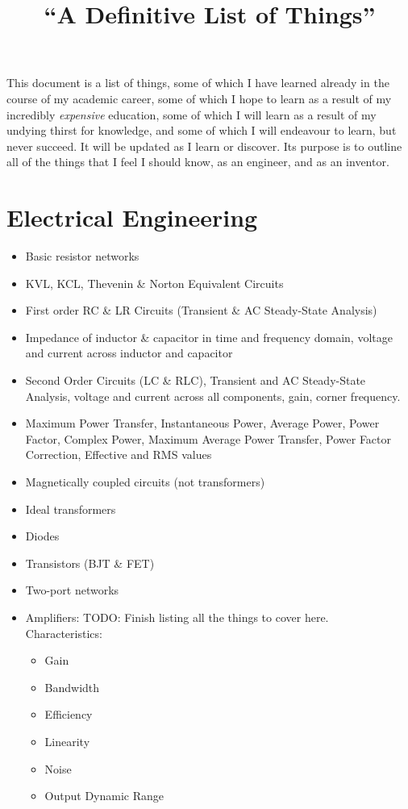 \documentclass[a4paper]{article}
\begin{document}
\title{``A Definitive List of Things''}

This document is a list of things, some of which I have learned already in the
course of my academic career, some of which I hope to learn as a result of my
incredibly \emph{expensive} education, some of which I will learn as a result
of my undying thirst for knowledge, and some of which I will endeavour to learn,
but never succeed. It will be updated as I learn or discover. Its purpose is to
outline all of the things that I feel I should know, as an engineer, and as an
inventor.

\section{Electrical Engineering}
\begin{itemize}
\item Basic resistor networks
\item KVL, KCL, Thevenin \& Norton Equivalent Circuits
\item First order RC \& LR Circuits (Transient \& AC Steady-State Analysis)
\item Impedance of inductor \& capacitor in time and frequency domain, voltage
  and current across inductor and capacitor
\item Second Order Circuits (LC \& RLC), Transient and AC Steady-State Analysis,
  voltage and current across all components, gain, corner frequency.
\item Maximum Power Transfer, Instantaneous Power, Average Power, Power Factor,
  Complex Power, Maximum Average Power Transfer, Power Factor Correction,
  Effective and RMS values
\item Magnetically coupled circuits (not transformers)
\item Ideal transformers
\item Diodes
\item Transistors (BJT \& FET)
\item Two-port networks
\item Amplifiers: TODO: Finish listing all the things to cover here.\\
  Characteristics:
  \begin{itemize}
  \item Gain
  \item Bandwidth
  \item Efficiency
  \item Linearity
  \item Noise
  \item Output Dynamic Range

\end{itemize}
\end{itemize}
\end{document}
